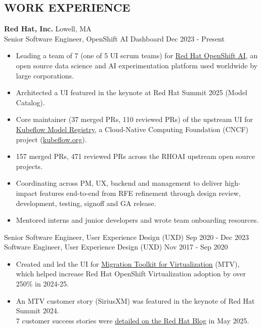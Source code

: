 \documentclass[line,margin]{res}
\begin{document}
\begin{resume}
\section{WORK EXPERIENCE}
	{\large \textbf{Red Hat, Inc.}}
    \hfill Lowell, MA \\
    Senior Software Engineer, OpenShift AI Dashboard
    \hfill Dec 2023 - Present
    \begin{itemize}  \itemsep -2pt %
        \item Leading a team of 7 (one of 5 UI scrum teams) for \href{https://www.redhat.com/en/products/ai/openshift-ai}{Red Hat OpenShift AI}, an open source data science and AI experimentation platform used worldwide by large corporations.
        \item Architected a UI featured in the keynote at Red Hat Summit 2025 (Model Catalog).
        \item Core maintainer (37 merged PRs, 110 reviewed PRs) of the upstream UI for \href{https://github.com/kubeflow/model-registry/graphs/contributors?selectedMetric=commits}{Kubeflow Model Registry}, a Cloud-Native Computing Foundation (CNCF) project (\href{https://www.kubeflow.org/}{kubeflow.org}).
        \item 157 merged PRs, 471 reviewed PRs across the RHOAI upstream open source projects.
        \item Coordinating across PM, UX, backend and management to deliver high-impact features end-to-end from RFE refinement through design review, development, testing, signoff and GA release.
        \item Mentored interns and junior developers and wrote team onboarding resources.
    \end{itemize}
    \vspace{-.5\baselineskip}
    Senior Software Engineer, User Experience Design (UXD) \hfill Sep 2020 - Dec 2023 \\
    Software Engineer, User Experience Design (UXD) \hfill Nov 2017 - Sep 2020
    \begin{itemize} \itemsep -2pt %
        \item Created and led the UI for \href{https://developers.redhat.com/products/mtv#massmigrationofvirtualmachines9352}{Migration Toolkit for Virtualization} (MTV), which helped increase Red Hat OpenShift Virtualization adoption by over 250\% in 2024-25.
        \item An MTV customer story (SiriusXM) was featured in the keynote of Red Hat Summit 2024.\\7 customer success stories were \href{https://www.redhat.com/en/blog/join-red-hat-openshift-virtualizations-momentum-2025}{detailed on the Red Hat Blog} in May 2025.

\end{itemize}
\end{resume}
\end{document}
